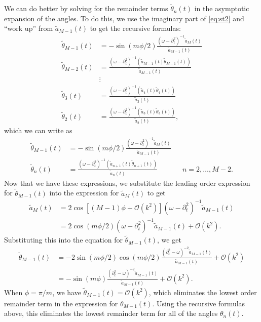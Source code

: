 \documentclass[11pt,reqno]{amsart}
\begin{document}
We can do better by solving for the remainder terms $\tilde{\theta}_n(t)$ in the asymptotic expansion of the angles. To do this, we use the imaginary part of \cref{eq:st2} and ``work up'' from $\tilde{a}_{M-1}(t)$ to get the recursive formulas:
\begin{align*}
\tilde{\theta}_{M-1}(t) &= -\sin(m\phi/2)\frac{ (\omega - \partial_t^2)^{-1} \tilde{a}_{M}(t)}{\tilde{a}_{M-1}(t)} \\
\tilde{\theta}_{M-2}(t) &= \frac{ (\omega - \partial_t^2)^{-1} \left( \tilde{a}_{M-1}(t) \tilde{\theta}_{M-1}(t) \right) }
{\tilde{a}_{M-1}(t)} \\
&\vdots \\
\tilde{\theta}_{3}(t) &= \frac{ (\omega - \partial_t^2)^{-1} \left( \tilde{a}_{4}(t) \tilde{\theta}_{4}(t) \right) }
{\tilde{a}_{3}(t)} \\
\tilde{\theta}_{2}(t) &= \frac{ (\omega - \partial_t^2)^{-1} \left( \tilde{a}_{3}(t) \tilde{\theta}_{3}(t) \right) }
{\tilde{a}_{2}(t)},
\end{align*}
which we can write as
\begin{align*}
\tilde{\theta}_{M-1}(t) &= -\sin(m\phi/2)\frac{ (\omega - \partial_t^2)^{-1} \tilde{a}_{M}(t)}{\tilde{a}_{M-1}(t)} \\
\tilde{\theta}_{n}(t) &= \frac{ (\omega - \partial_t^2)^{-1} \left( \tilde{a}_{n+1}(t) \tilde{\theta}_{n+1}(t) \right) }
{\tilde{a}_{n}(t)} && n = 2, \dots, M-2.
\end{align*}
Now that we have these expressions, we substitute the leading order expression for $\tilde{\theta}_{M-1}(t)$ into the expression for $\tilde{a}_{M}(t)$ to get
\begin{align*}
\tilde{a}_{M}(t) &= 2 \cos[(M-1)\phi + \mathcal{O}(k^2) ] (\omega - \partial_t^2)^{-1} \tilde{a}_{M-1}(t) \\
&= 2 \cos(m \phi/2) (\omega - \partial_t^2)^{-1} \tilde{a}_{M-1}(t) + \mathcal{O}(k^2).
\end{align*}
Substituting this into the equation for $\tilde{\theta}_{M-1}(t)$, we get
\begin{align*}
\tilde{\theta}_{M-1}(t) &= -2 \sin(m \phi/2)\cos(m \phi/2)\frac{ (\partial_t^2 - \omega)^{-2} \tilde{a}_{M-1}(t)}{\tilde{a}_{M-1}(t)} + \mathcal{O}(k^2) \\
&= -\sin(m \phi)\frac{ (\partial_t^2 - \omega)^{-2} \tilde{a}_{M-1}(t)}{\tilde{a}_{M-1}(t)} + \mathcal{O}(k^2).
\end{align*}
When $\phi = \pi/m$, we have $\tilde{\theta}_{M-1}(t) = \mathcal{O}(k^2)$, which eliminates the lowest order remainder term in the expression for $\theta_{M-1}(t)$. Using the recursive formulas above, this eliminates the lowest remainder term for all of the angles $\theta_n(t)$.
\end{document}
